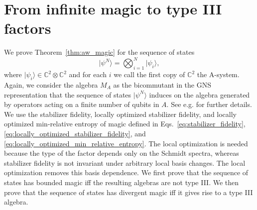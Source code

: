 \documentclass[aps,pra,reprint,superscriptaddress]{revtex4-2}
\newcommand{\bbC}{\mathbb C}
\providecommand{\ket}[1]{\lvert #1\rangle}
\theoremstyle{definition}
\theoremstyle{remark}
\begin{document}
\section{From infinite magic to type III factors}\label{app:araki-woods}

\begingroup
We prove Theorem~\ref{thm:aw_magic} for the sequence of states
\begin{equation}
    \ket{\psi^N} = \bigotimes_{i=1}^{N} \ket{\psi_i},
\end{equation}
where $\ket{\psi_i} \in \bbC^2 \otimes \bbC^2$ and for each $i$ we call the first copy of $\bbC^2$ the A-system. Again, we consider the algebra $M_A$ as the bicommutant in the GNS representation that the sequence of states $\ket{\psi^N}$ induces on the algebra generated by operators acting on a finite number of qubits in $A$. See e.g. \cite{ArakiWoods1968, Witten:2018zxz, Chemissany:2025vye} for further details. We use the stabilizer fidelity,
locally optimized stabilizer fidelity, and locally optimized min-relative
entropy of magic defined in Eqs.~\eqref{eq:stabilizer_fidelity},
\eqref{eq:locally_optimized_stabilizer_fidelity}, and
\eqref{eq:locally_optimized_min_relative_entropy}. The local optimization is
needed because the type of the factor depends only on the Schmidt spectra, whereas
stabilizer fidelity is not invariant under arbitrary local basis changes. The
local optimization removes this basis dependence. We first prove that the
sequence of states has bounded magic iff the resulting algebras are not type
III.
We then prove that the sequence of states has divergent magic iff it gives rise
to a type III algebra.
\end{document}
